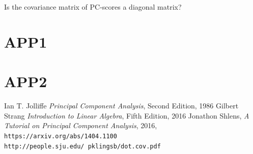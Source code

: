 \documentclass[10pt,twocolumn]{article}
\begin{document}
Is the covariance matrix of PC-scores a diagonal matrix?



\appendix

\section{APP1} \label{app:A}

\section{APP2} \label{app:B}

\thebibliography{}

 Ian T. Jolliffe \textit{Principal Component Analysis}, Second Edition, 1986
 Gilbert Strang \textit{Introduction to Linear Algebra}, Fifth Edition, 2016
 Jonathon Shlens, \textit{A Tutorial on Principal Component Analysis}, 2016, \texttt{https://arxiv.org/abs/1404.1100}
 \texttt{http://people.sju.edu/~pklingsb/dot.cov.pdf}

 \label{bib:pope}
\end{document}
